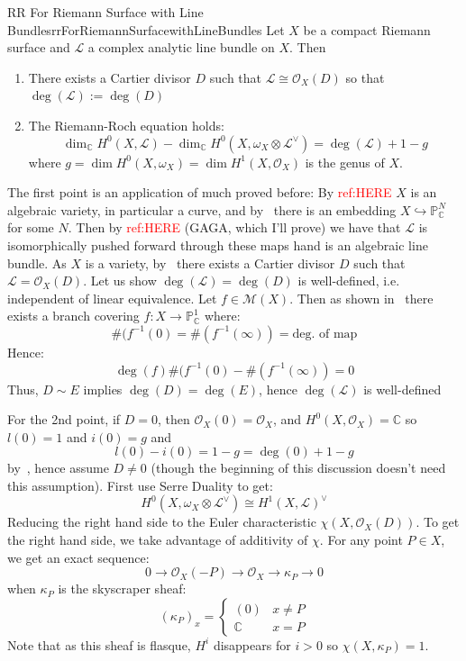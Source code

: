 \documentclass{book}
\newcommand{\C}{{\mathbb{C}}}
\renewcommand{\P}{{\mathbb{P}}}
\newcommand{\CL}{{\mathcal{L}}}
\newcommand{\CM}{{\mathcal{M}}}
\newcommand{\CO}{{\mathcal{O}}}
\begin{document}
\begin{thm}{RR For Riemann Surface with Line Bundles}{rrForRiemannSurfacewithLineBundles}
  Let $X$ be a compact Riemann surface and $\CL$ a complex analytic line bundle on $X$. Then
  \begin{enumerate}
    \item There exists a Cartier divisor $D$ such that $\CL\cong \CO_X(D)$ so that $\deg(\CL) := \deg(D)$
    \item The Riemann-Roch equation holds:
      \[
        \dim_\C H^0(X, \CL) - \dim_\C H^0(X, \omega_X\otimes \CL^\vee) = \deg(\CL) + 1-g
      \]
      where $g = \dim H^0(X, \omega_X) = \dim H^1(X, \CO_X)$ is the genus of $X$.
  \end{enumerate}
\end{thm}

\begin{Proof}
  The first point is an application of much proved before: By \textcolor{red}{ref:HERE} $X$ is an algebraic
  variety, in particular a curve, and by~\cite[section~6.1]{NateAlgGeo} there is an embedding $X
  \hookrightarrow \P_\C^N$ for some $N$. Then by \textcolor{red}{ref:HERE} (GAGA, which I'll prove) we have
  that $\CL$ is isomorphically pushed forward through these maps hand is an algebraic line bundle. As $X$ is
  a variety, by~\cite[section~4.3]{NateAlgGeo} there exists a Cartier divisor $D$ such that $\CL = \CO_X(D)$.
  Let us show $\deg(\CL) = \deg(D)$ is well-defined, i.e. independent of linear equivalence. Let $f \in
  \CM(X)$. Then as shown in~\cite[section~6.3]{NateComplexAnalysis} there exists a branch covering $f: X \to
  \P_\C^1$ where:
  \[
    \#(f^{-1}(0) = \#(f^{-1}(\infty)) = \text{deg. of map}
  \]
  Hence:
  \[
    \deg(f) \#(f^{-1}(0) - \#(f^{-1}(\infty)) = 0
  \]
  Thus, $D\sim E$ implies $\deg(D) = \deg(E)$, hence $\deg(\CL)$ is well-defined

  For the 2nd point, if $D = 0$, then $\CO_X(0) = \CO_X$, and $H^0(X, \CO_X) = \C$ so $l(0) = 1$ and $i(0) =
  g$ and
  \[
    l(0) - i(0) = 1-g = \deg(0) + 1-g
  \]
  by~\cite[section~6.3]{NateComplexAnalysis}, hence assume $D \ne 0$ (though the beginning of this discussion
  doesn't need this assumption). First use Serre Duality to get:
  \[
    H^0(X, \omega_X\otimes \CL^\vee) \cong H^1(X, \CL)^\vee
  \]
  Reducing the right hand side to the Euler characteristic $\chi(X, \CO_X(D))$. To get the right hand side, we
  take advantage of additivity of $\chi$. For any point $P \in X$, we get an exact sequence:
  \[
    0 \to \CO_X(-P) \to \CO_X \to \kappa_P \to 0
  \]
  when $\kappa_P$ is the skyscraper sheaf:
  \[
    (\kappa_P)_x = \begin{cases}
      (0) & x \ne P\\
      \C & x = P
    \end{cases}
  \]
  Note that as this sheaf is flasque, $H^i$ disappears for $i > 0$ so $\chi(X, \kappa_P) = 1$.


\end{Proof}
\end{document}

